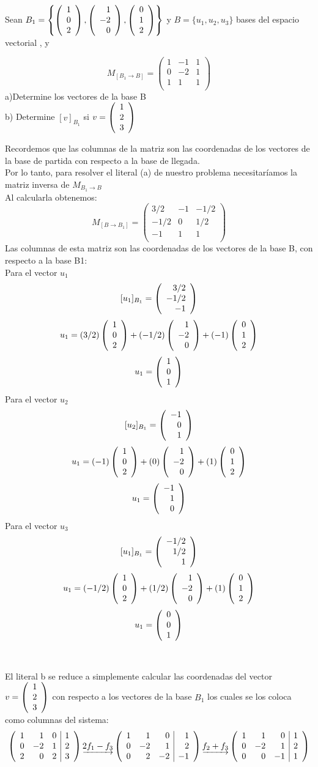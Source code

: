 \begin{ejercicio}
Sean $B_1=\llav{\vectrtres{1}{0}{2}, \vectrtres{1}{-2}{0}, \vectrtres{0}{1}{2}}$ y $B=\{u_1, u_2, u_3\}$ bases del espacio vectorial \rtres, y 

\[M_{[B_1 \rightarrow B]}=\left(\begin{array}{rrr}
1&-1&1\\
0&-2&1\\
1&1&1\\
\end{array}\right)\]
a)Determine los vectores de la base B
~\\b) Determine $[v]_{B_1}$ si $v=\vectrtres{1}{2}{3}$

\sol
Recordemos que las columnas de la matriz son las coordenadas de los vectores de la base de partida con respecto a la base de llegada.~\\
Por lo tanto, para resolver el literal (a) de nuestro problema necesitaríamos la matriz inversa de $M_{B_1 \rightarrow B}$~\\
Al calcularla obtenemos:~\\

\[M_{[B \rightarrow B_1]}=\left(\begin{array}{rrr}
3/2&-1&-1/2\\
-1/2&0&1/2\\
-1&1&1\\
\end{array}\right)\]
Las columnas de esta matriz son las coordenadas de los vectores de la base B, con respecto a la base B1:
~\\
Para el vector $u_1$~\\
$$[u_1]_{B_1}=\vectrtres{3/2}{-1/2}{-1}$$
$$u_1=(3/2)\vectrtres{1}{0}{2}+(-1/2)\vectrtres{1}{-2}{0}+(-1)\vectrtres{0}{1}{2}$$
$$u_1=\vectrtres{1}{0}{1}$$
Para el vector $u_2$~\\
$$[u_2]_{B_1}=\vectrtres{-1}{0}{1}$$
$$u_1=(-1)\vectrtres{1}{0}{2}+(0)\vectrtres{1}{-2}{0}+(1)\vectrtres{0}{1}{2}$$
$$u_1=\vectrtres{-1}{1}{0}$$
Para el vector $u_3$~\\
$$[u_1]_{B_1}=\vectrtres{-1/2}{1/2}{1}$$
$$u_1=(-1/2)\vectrtres{1}{0}{2}+(1/2)\vectrtres{1}{-2}{0}+(1)\vectrtres{0}{1}{2}$$
$$u_1=\vectrtres{0}{0}{1}$$
~\\
~\\
El literal b se reduce a simplemente calcular las coordenadas del vector $v=\vectrtres{1}{2}{3}$ con respecto a los vectores de la base $B_1$ los cuales se los coloca como columnas del sistema:
$$\reducir{rrr|r}{1&1&0&1\\
0&-2&1&2\\
2&0&2&3\\}
\underrightarrow{2f_1 - f_3}
\reducir{rrr|r}{1&1&0&1\\
0&-2&1&2\\
0&2&-2&-1\\}
\underrightarrow{f_2 + f_3}
\reducir{rrr|r}{
1&1&0&1\\
0&-2&1&2\\
0&0&-1&1\\}
$$



\end{ejercicio}
